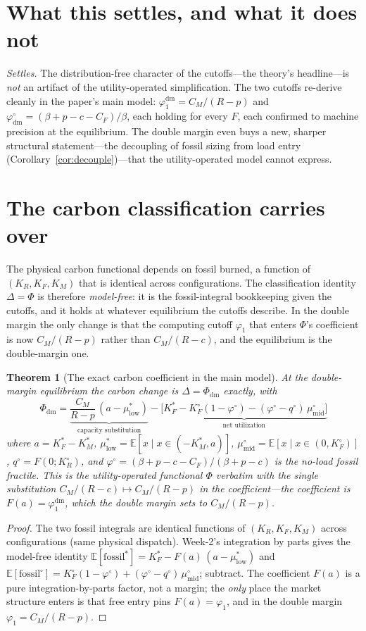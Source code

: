 \documentclass[11pt,reqno]{amsart}
\theoremstyle{plain}\newtheorem{theorem}{Theorem}\newtheorem{proposition}[theorem]{Proposition}
\theoremstyle{remark}\newtheorem{remark}[theorem]{Remark}\newtheorem{observation}[theorem]{Observation}
\newcommand{\KR}{K_R}\newcommand{\KF}{K_F}\newcommand{\KM}{K_M}
\newcommand{\CM}{C_M}\newcommand{\CF}{C_F}\newcommand{\CR}{C_R}
\newcommand{\phio}{\varphi^{\circ}}\newcommand{\FKR}{F_{\KR}}\newcommand{\Dbar}{\bar D}
\newcommand{\KFo}{K_F^{\circ}}\newcommand{\KRo}{K_R^{\circ}}\newcommand{\fossil}{\mathrm{fossil}}
\newcommand{\E}{\mathbb{E}}\newcommand{\bp}{\beta+p}
\begin{document}
\section{What this settles, and what it does not}
\emph{Settles.} The distribution-free character of the cutoffs---the theory's headline---is
\emph{not} an artifact of the utility-operated simplification. The two cutoffs re-derive
cleanly in the paper's main model: $\varphi_1^{\mathrm{dm}}=\CM/(R-p)$ and
$\phio_{\mathrm{dm}}=(\bp-c-\CF)/\beta$, each holding for every $F$, each confirmed to machine
precision at the equilibrium. The double margin even buys a new, sharper structural
statement---the decoupling of fossil sizing from load entry (Corollary~\ref{cor:decouple})---that
the utility-operated model cannot express.

\section{The carbon classification carries over}
The physical carbon functional depends on fossil burned, a function of $(\KR,\KF,\KM)$ that is
identical across configurations. The classification identity $\Delta=\Phi$ is therefore
\emph{model-free}: it is the fossil-integral bookkeeping given the cutoffs, and it holds at
whatever equilibrium the cutoffs describe. In the double margin the only change is that the
computing cutoff $\varphi_1$ that enters $\Phi$'s coefficient is now $\CM/(R-p)$ rather than
$\CM/(R-c)$, and the equilibrium is the double-margin one.
\begin{theorem}[The exact carbon coefficient in the main model]\label{prop:dmidentity}
At the double-margin equilibrium the carbon change is $\Delta=\Phi_{\mathrm{dm}}$ exactly, with
\[
  \boxed{\;\Phi_{\mathrm{dm}}
  =\underbrace{\frac{\CM}{R-p}\,(a-\mu^{*}_{\mathrm{low}})}_{\text{capacity substitution}}
  -\underbrace{\big[\KF^{*}-\KFo(1-\phio)-(\phio-q^{\circ})\,\mu^{\circ}_{\mathrm{mid}}\big]}_{\text{net utilization}}\;}
\]
where $a=\KF^{*}-\KM^{*}$, $\mu^{*}_{\mathrm{low}}=\E[x\mid x\in(-\KM^{*},a)]$,
$\mu^{\circ}_{\mathrm{mid}}=\E[x\mid x\in(0,\KFo)]$, $q^{\circ}=F(0;\KRo)$, and
$\phio=(\bp-c-\CF)/(\bp-c)$ is the no-load fossil fractile. This is the utility-operated
functional $\Phi$ verbatim with the single substitution
$\CM/(R-c)\mapsto\CM/(R-p)$ in the coefficient---the coefficient is $F(a)=\varphi_1^{\mathrm{dm}}$,
which the double margin sets to $\CM/(R-p)$.
\end{theorem}
\begin{proof}
The two fossil integrals are identical functions of $(\KR,\KF,\KM)$ across configurations
(same physical dispatch). Week-2's integration by parts gives the model-free identity
$\E[\fossil^{*}]=\KF^{*}-F(a)\,(a-\mu^{*}_{\mathrm{low}})$ and
$\E[\fossil^{\circ}]=\KFo(1-\phio)+(\phio-q^{\circ})\,\mu^{\circ}_{\mathrm{mid}}$; subtract.
The coefficient $F(a)$ is a pure integration-by-parts factor, not a margin; the \emph{only}
place the market structure enters is that free entry pins $F(a)=\varphi_1$, and in the double
margin $\varphi_1=\CM/(R-p)$.
\end{proof}
\end{document}
